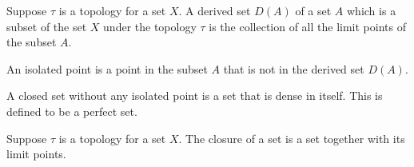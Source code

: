 \begin{definition}
	\label{definition-dense-in-itself}
	Suppose $\tau$ is a topology for a set $X$.
	A derived set $D(A)$ of a set $A$ which is a subset of the set $X$ under the topology $\tau$ is the collection of all the limit points of the subset $A$.

	An isolated point is a point in the subset $A$ that is not in the derived set $D(A)$.

	A closed set without any isolated point is a set that is dense in itself. This is defined to be a perfect set.
\end{definition}

\begin{definition}
	\label{definition-closure}
	Suppose $\tau$ is a topology for a set $X$.
	The closure of a set is a set together with its limit points.
\end{definition}